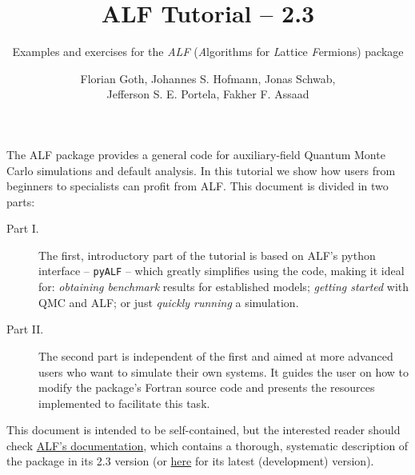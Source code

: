 \documentclass[10pt,modern]{scrartcl}
\numberwithin{exerciseitem}{exercise} %
\newcommand{\ALFver}{2.3}          %
\newcommand{\ALFbranch}{ALF-2.3}   %
\newcommand{\tutALFver}{2.3}       %
\begin{document}
\title{ ALF Tutorial -- \tutALFver{} }
\subtitle{Examples and exercises for the \emph{ALF} (\emph{A}lgorithms for \emph{L}attice \emph{F}ermions) package} %
\author{Florian Goth,  Johannes S. Hofmann,  Jonas Schwab,\\  Jefferson S. E. Portela,  Fakher F. Assaad }
\maketitle



The ALF package provides a general code for auxiliary-field Quantum Monte Carlo simulations and default analysis. In this tutorial we show how users from beginners to specialists can profit from ALF. This document is divided in two parts:
\begin{description}
\item[Part I.] The first, introductory part of the tutorial is based on ALF's python interface -- \texttt{pyALF} -- which greatly simplifies using the code, making it ideal for: \emph{obtaining benchmark} results for established models; \emph{getting started} with QMC and ALF; or just \emph{quickly running} a simulation.
\item[Part II.] The second part is independent of the first and aimed at more advanced users who want to simulate their own systems. It guides the user on how to modify the package's Fortran source code and presents the resources implemented to facilitate this task.
\end{description}

This document is intended to be self-contained, but the interested reader should check \href{https://git.physik.uni-wuerzburg.de/ALF/ALF/-/blob/\ALFbranch/Documentation/doc.pdf}{ALF's documentation}, which contains a thorough, systematic description of the package in its \ALFver{} version (or \href{https://git.physik.uni-wuerzburg.de/ALF/ALF/-/blob/master/Documentation/doc.pdf}{here} for its latest (development) version).
\end{document}
